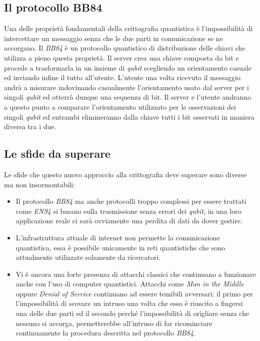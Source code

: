\documentclass[a4paper, 12pt]{article}
\begin{document}
\subsection{Il protocollo BB84}
Una delle proprietà fondamentali della crittografia quantistica è l'impossibilità di intercettare un messaggio senza che le due parti in comunicazione se ne accorgano.\newline
Il \textit{BB84} è un protocollo quantistico di distribuzione delle chiavi che utilizza a pieno questa proprietà.\newline
Il server crea una chiave composta da bit e procede a trasformarla in un insieme di \textit{qubit} scegliendo un orientamento casuale ed inviando infine il tutto all'utente.
L'utente una volta ricevuto il messaggio andrà a misurare indovinando casualmente l'orientamento usato dal server per i singoli \textit{qubit} ed otterrà dunque una sequenza di bit. Il server e l'utente andranno a questo punto a comparare l'orientamento utilizzato per le osservazioni dei singoli \textit{qubit} ed entrambi elimineranno dalla chiave tutti i bit osservati in maniera diversa tra i due.
\subsection{Le sfide da superare}
Le sfide che questo nuovo approccio alla crittografia deve superare sono diverse ma non insormontabili:
\begin{itemize}
\item Il protocollo \textit{BB84} ma anche protocolli troppo complessi per essere trattati come \textit{EN94} si basano sulla trasmissione senza errori dei \textit{qubit}, in una loro applicazione reale ci sarà ovviamente una perdita di dati da dover gestire.
\item L'infrastruttura attuale di internet non permette la comunicazione quantistica, essa è possibile unicamente in reti quantistiche che sono attualmente utilizzate solamente da ricercatori.
\item Vi è ancora una forte presenza di attacchi classici che continuano a funzionare anche con l'uso di computer quantistici. Attacchi come \textit{Man in the Middle} oppure \textit{Denial of Service} continuano ad essere temibili avversari: il primo per l'impossibilità di scovare un intruso una volta che esso è riuscito a fingersi una delle due parti ed il secondo perché l'impossibilità di origliare senza che nessuno si accorga, permetterebbe all'intruso di far ricominciare continuamente la procedura descritta nel protocollo \textit{BB84}.
\end{itemize}
\clearpage
\end{document}
